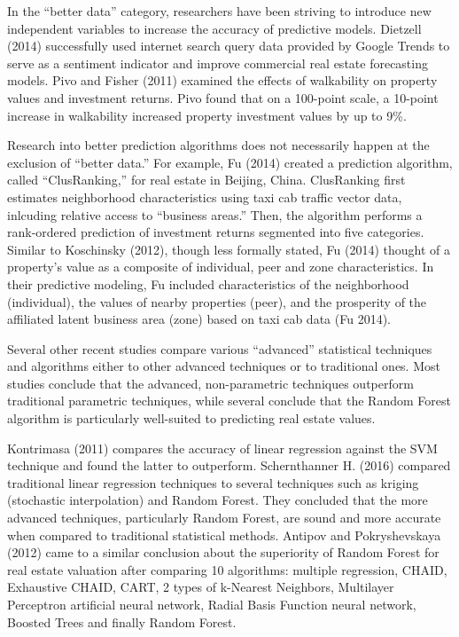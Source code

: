\documentclass[12pt,]{article}
\begin{document}
In the ``better data'' category, researchers have been striving to
introduce new independent variables to increase the accuracy of
predictive models. Dietzell (2014) successfully used internet search
query data provided by Google Trends to serve as a sentiment indicator
and improve commercial real estate forecasting models. Pivo and Fisher
(2011) examined the effects of walkability on property values and
investment returns. Pivo found that on a 100-point scale, a 10-point
increase in walkability increased property investment values by up to
9\%.

Research into better prediction algorithms does not necessarily happen
at the exclusion of ``better data.'' For example, Fu (2014) created a
prediction algorithm, called ``ClusRanking,'' for real estate in
Beijing, China. ClusRanking first estimates neighborhood characteristics
using taxi cab traffic vector data, inlcuding relative access to
``business areas.'' Then, the algorithm performs a rank-ordered
prediction of investment returns segmented into five categories. Similar
to Koschinsky (2012), though less formally stated, Fu (2014) thought of
a property's value as a composite of individual, peer and zone
characteristics. In their predictive modeling, Fu included
characteristics of the neighborhood (individual), the values of nearby
properties (peer), and the prosperity of the affiliated latent business
area (zone) based on taxi cab data (Fu 2014).

Several other recent studies compare various ``advanced'' statistical
techniques and algorithms either to other advanced techniques or to
traditional ones. Most studies conclude that the advanced,
non-parametric techniques outperform traditional parametric techniques,
while several conclude that the Random Forest algorithm is particularly
well-suited to predicting real estate values.

Kontrimasa (2011) compares the accuracy of linear regression against the
SVM technique and found the latter to outperform. Schernthanner H.
(2016) compared traditional linear regression techniques to several
techniques such as kriging (stochastic interpolation) and Random Forest.
They concluded that the more advanced techniques, particularly Random
Forest, are sound and more accurate when compared to traditional
statistical methods. Antipov and Pokryshevskaya (2012) came to a similar
conclusion about the superiority of Random Forest for real estate
valuation after comparing 10 algorithms: multiple regression, CHAID,
Exhaustive CHAID, CART, 2 types of k-Nearest Neighbors, Multilayer
Perceptron artificial neural network, Radial Basis Function neural
network, Boosted Trees and finally Random Forest.
\end{document}
